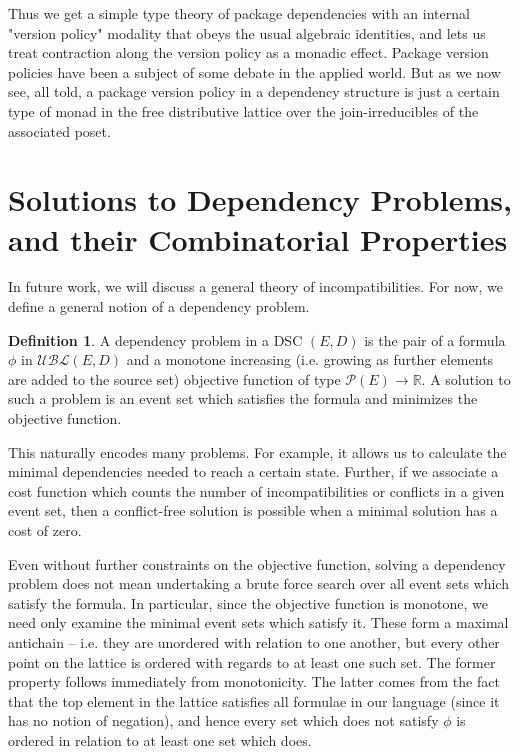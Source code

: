 \documentclass[hoptionsi,review,format=acmsmall]{acmart}
\theoremstyle{definition}
\newtheorem{definition}{Definition}[section]
\newcommand{\UBLc}{\mathcal{UBL}}
\newcommand{\Pc}{\mathcal{P}}
\begin{document}
Thus we get a simple type theory of package dependencies with an internal "version policy" modality that obeys the usual algebraic identities, and lets us treat contraction along the version policy as a monadic effect. Package version policies have been a subject of some debate in the applied world. But as we now see, all told, a package version policy in a dependency structure is just a certain type of monad in the free distributive lattice over the join-irreducibles of the associated poset.


\section{Solutions to Dependency Problems, and their Combinatorial Properties}
In future work, we will discuss a general theory of incompatibilities. For now, we define a general notion of a dependency problem.

\begin{definition}
A dependency problem in a DSC \((E,D)\) is the pair of a formula \(\phi\) in \(\UBLc(E,D)\) and a monotone increasing (i.e. growing as further elements are added to the source set) objective function of type \(\Pc(E) \rightarrow \mathbb{R}\). A solution to such a problem is an event set which satisfies the formula and minimizes the objective function.
\end{definition}

This naturally encodes many problems. For example, it allows us to calculate the minimal dependencies needed to reach a certain state. Further, if we associate a cost function which counts the number of incompatibilities or conflicts in a given event set, then a conflict-free solution is possible when a minimal solution has a cost of zero.

Even without further constraints on the objective function, solving a dependency problem does not mean undertaking a brute force search over all event sets which satisfy the formula. In particular, since the objective function is monotone, we need only examine the minimal event sets which satisfy it. These form a maximal  antichain -- i.e. they are unordered with relation to one another, but every other point on the lattice is ordered with regards to at least one such set. The former property follows immediately from monotonicity. The latter comes from the fact that the top element in the lattice satisfies all formulae in our language (since it has no notion of negation), and hence every set which does not satisfy \(\phi\) is ordered in relation to at least one set which does.
\end{document}
